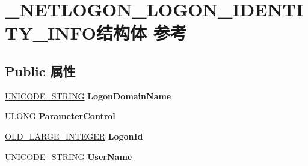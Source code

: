 \hypertarget{struct___n_e_t_l_o_g_o_n___l_o_g_o_n___i_d_e_n_t_i_t_y___i_n_f_o}{}\section{\+\_\+\+N\+E\+T\+L\+O\+G\+O\+N\+\_\+\+L\+O\+G\+O\+N\+\_\+\+I\+D\+E\+N\+T\+I\+T\+Y\+\_\+\+I\+N\+F\+O结构体 参考}
\label{struct___n_e_t_l_o_g_o_n___l_o_g_o_n___i_d_e_n_t_i_t_y___i_n_f_o}
\subsection*{Public 属性}
\begin{DoxyCompactItemize}
\item 
\mbox{\label{struct___n_e_t_l_o_g_o_n___l_o_g_o_n___i_d_e_n_t_i_t_y___i_n_f_o_aad1c50460c3f38debd1ddffc650116cf}} 
\hyperlink{struct___u_n_i_c_o_d_e___s_t_r_i_n_g}{U\+N\+I\+C\+O\+D\+E\+\_\+\+S\+T\+R\+I\+NG} {\bfseries Logon\+Domain\+Name}
\item 
\mbox{\label{struct___n_e_t_l_o_g_o_n___l_o_g_o_n___i_d_e_n_t_i_t_y___i_n_f_o_a9e8c03c07d9f067dde78543ddd02c463}} 
U\+L\+O\+NG {\bfseries Parameter\+Control}
\item 
\mbox{\label{struct___n_e_t_l_o_g_o_n___l_o_g_o_n___i_d_e_n_t_i_t_y___i_n_f_o_aa9d07bebe755e12c11d3e7096f4b89c0}} 
\hyperlink{struct___o_l_d___l_a_r_g_e___i_n_t_e_g_e_r}{O\+L\+D\+\_\+\+L\+A\+R\+G\+E\+\_\+\+I\+N\+T\+E\+G\+ER} {\bfseries Logon\+Id}
\item 
\mbox{\label{struct___n_e_t_l_o_g_o_n___l_o_g_o_n___i_d_e_n_t_i_t_y___i_n_f_o_a82f2475c3e5ea25a345d86f912ef0b3a}} 
\hyperlink{struct___u_n_i_c_o_d_e___s_t_r_i_n_g}{U\+N\+I\+C\+O\+D\+E\+\_\+\+S\+T\+R\+I\+NG} {\bfseries User\+Name}
\item 
\mbox{\label{struct___n_e_t_l_o_g_o_n___l_o_g_o_n___i_d_e_n_t_i_t_y___i_n_f_o_ac6cfeb3c3d60679b39a7c7998516acf4}} 

\end{DoxyCompactItemize}
